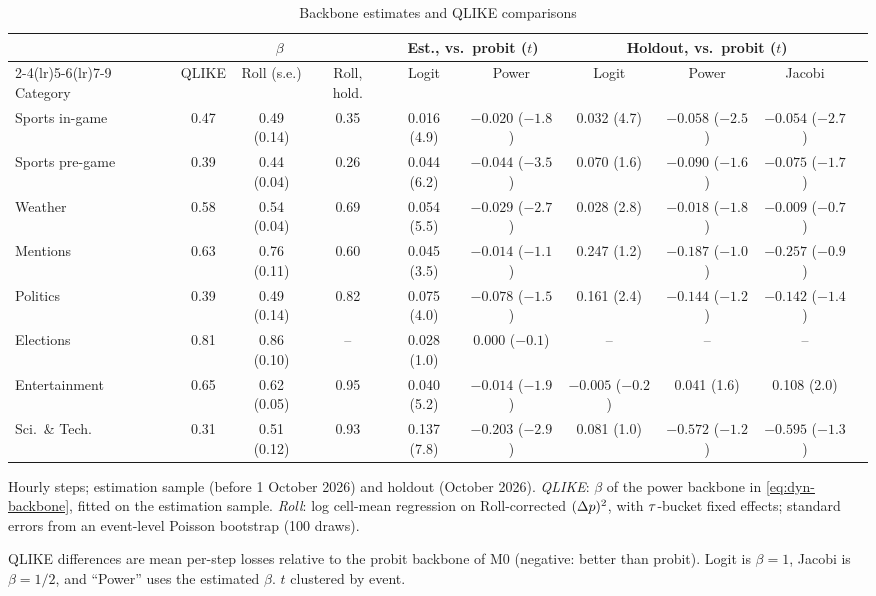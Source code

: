 \begin{table}[ht]
\centering
\begin{threeparttable}
\caption{Backbone estimates and QLIKE comparisons}\label{tab:dyn-backbone}
\scriptsize
\setlength{\tabcolsep}{2.2pt}
\begin{tabular}{lccccccccc}
\toprule
 & \multicolumn{3}{c}{$\beta$} & \multicolumn{2}{c}{Est., vs.\ probit ($t$)} & \multicolumn{3}{c}{Holdout, vs.\ probit ($t$)} \\
\cmidrule(lr){2-4}\cmidrule(lr){5-6}\cmidrule(lr){7-9}
Category & QLIKE & Roll (s.e.) & Roll, hold. & Logit & Power & Logit & Power & Jacobi \\
\midrule
Sports in-game & 0.47 & 0.49 (0.14) & 0.35 & 0.016 (4.9) & $-0.020$ ($-1.8$) & 0.032 (4.7) & $-0.058$ ($-2.5$) & $-0.054$ ($-2.7$) \\
Sports pre-game & 0.39 & 0.44 (0.04) & 0.26 & 0.044 (6.2) & $-0.044$ ($-3.5$) & 0.070 (1.6) & $-0.090$ ($-1.6$) & $-0.075$ ($-1.7$) \\
Weather & 0.58 & 0.54 (0.04) & 0.69 & 0.054 (5.5) & $-0.029$ ($-2.7$) & 0.028 (2.8) & $-0.018$ ($-1.8$) & $-0.009$ ($-0.7$) \\
Mentions & 0.63 & 0.76 (0.11) & 0.60 & 0.045 (3.5) & $-0.014$ ($-1.1$) & 0.247 (1.2) & $-0.187$ ($-1.0$) & $-0.257$ ($-0.9$) \\
Politics & 0.39 & 0.49 (0.14) & 0.82 & 0.075 (4.0) & $-0.078$ ($-1.5$) & 0.161 (2.4) & $-0.144$ ($-1.2$) & $-0.142$ ($-1.4$) \\
Elections & 0.81 & 0.86 (0.10) & -- & 0.028 (1.0) & 0.000 ($-0.1$) & -- & -- & -- \\
Entertainment & 0.65 & 0.62 (0.05) & 0.95 & 0.040 (5.2) & $-0.014$ ($-1.9$) & $-0.005$ ($-0.2$) & 0.041 (1.6) & 0.108 (2.0) \\
Sci.\ \& Tech. & 0.31 & 0.51 (0.12) & 0.93 & 0.137 (7.8) & $-0.203$ ($-2.9$) & 0.081 (1.0) & $-0.572$ ($-1.2$) & $-0.595$ ($-1.3$) \\
\bottomrule
\end{tabular}
\begin{tablenotes}[flushleft]\footnotesize
\item Hourly steps; estimation sample (before 1 October 2026) and holdout (October 2026). \emph{QLIKE}: $\beta$ of the power backbone in \cref{eq:dyn-backbone}, fitted on the estimation sample. \emph{Roll}: log cell-mean regression on Roll-corrected $(\Delta p)^2$, with $\tau$-bucket fixed effects; standard errors from an event-level Poisson bootstrap (100 draws).
\item QLIKE differences are mean per-step losses relative to the probit backbone of M0 (negative: better than probit). Logit is $\beta=1$, Jacobi is $\beta=1/2$, and ``Power'' uses the estimated $\beta$. $t$ clustered by event.
\end{tablenotes}
\end{threeparttable}
\end{table}
